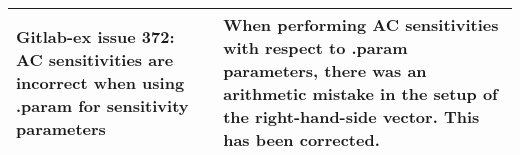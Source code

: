 {\begin{longtable}[h] {>{\raggedright\small}m{2in}|>{\raggedright\let\\\tabularnewline\small}m{3.5in}}
\textbf{Gitlab-ex issue 372}:  AC sensitivities are incorrect when using .param for sensitivity parameters & 
When performing AC sensitivities with respect to .param parameters, there was an arithmetic mistake
in the setup of the right-hand-side vector.  This has been corrected.  \\ \hline

\end{longtable}
}
